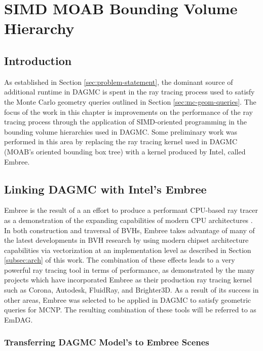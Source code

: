 
\chapter{SIMD MOAB Bounding Volume Hierarchy}\label{ch:simd_bvh}


\section{Introduction}

As established in Section \ref{sec:problem-statement}, the dominant source of
additional runtime in DAGMC is spent in the ray tracing process used to satisfy
the Monte Carlo geometry queries outlined in Section \ref{sec:mc-geom-queries}.
The focus of the work in this chapter is improvements on the performance of the
ray tracing process through the application of SIMD-oriented programming in the
bounding volume hierarchies used in DAGMC. Some preliminary work was performed
in this area by replacing the ray tracing kernel used in DAGMC (MOAB's oriented
bounding box tree) with a kernel produced by Intel, called Embree.

\section{Linking DAGMC with Intel's Embree}\label{sec:embree}

Embree is the result of a an effort to produce a performant CPU-based ray tracer
as a demonstration of the expanding capabilities of modern CPU architectures
\cite{Wald_2014}. In both construction and traversal of BVHs, Embree takes
advantage of many of the latest developments in BVH research by using modern
chipset architecture capabilities via vectorization at an implementation level
as described in Section \ref{subsec:arch} of this work. The combination of these
effects leads to a very powerful ray tracing tool in terms of performance, as
demonstrated by the many projects which have incorporated Embree as their
production ray tracing kernel such as Corona, Autodesk, FluidRay, and
Brighter3D. As a result of its success in other areas, Embree was selected to be
applied in DAGMC to satisfy geometric queries for MCNP. The resulting
combination of these tools will be referred to as EmDAG.

\subsection{Transferring DAGMC Model's to Embree Scenes}\label{sec:emdag_transfer}

